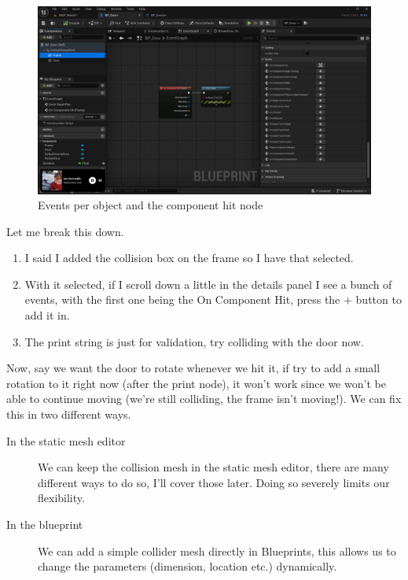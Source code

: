 \documentclass[]{article}
\begin{document}
	\begin{figure}[h]
		\centering
		\includegraphics[width=1\linewidth]{day4images/screenshot007}
		\caption{Events per object and the component hit node}
		\label{fig:screenshot007}
	\end{figure}
	
	Let me break this down.
	\begin{enumerate}
		\item I said I added the collision box on the frame so I have that selected.
		\item With it selected, if I scroll down a little in the details panel I see a bunch of events, with the first one being the On Component Hit, press the $+$ button to add it in.
		\item The print string is just for validation, try colliding with the door now.
	\end{enumerate}
	
	Now, say we want the door to rotate whenever we hit it, if try to add a small rotation to it right now (after the print node), it won't work since we won't be able to continue moving (we're still colliding, the frame isn't moving!). We can fix this in two different ways.
	\begin{description}
		\item[In the static mesh editor] We can keep the collision mesh in the static mesh editor, there are many different ways to do so, I'll cover those later. Doing so severely limits our flexibility.
		\item[In the blueprint] We can add a simple collider mesh directly in Blueprints, this allows us to change the parameters (dimension, location etc.) dynamically.
	\end{description}
	
\end{document}
